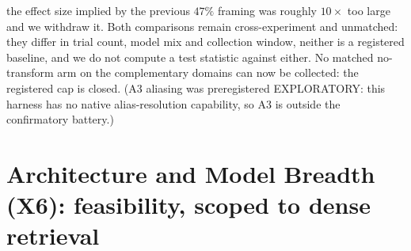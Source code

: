 \documentclass{article}
\begin{document}
the effect size implied by the previous $47\%$ framing was roughly $10\times$ too large and we withdraw it. Both comparisons remain cross-experiment and unmatched: they differ in trial count, model mix and collection window, neither is a registered baseline, and we do not compute a test statistic against either. No matched no-transform arm on the complementary domains can now be collected: the registered cap is closed. (A3 aliasing was preregistered EXPLORATORY: this harness has no native alias-resolution capability, so A3 is outside the confirmatory battery.)

\section{Architecture and Model Breadth (X6): feasibility, scoped to dense retrieval}
\label{app:x6}
\label{sec:x6}
\end{document}
